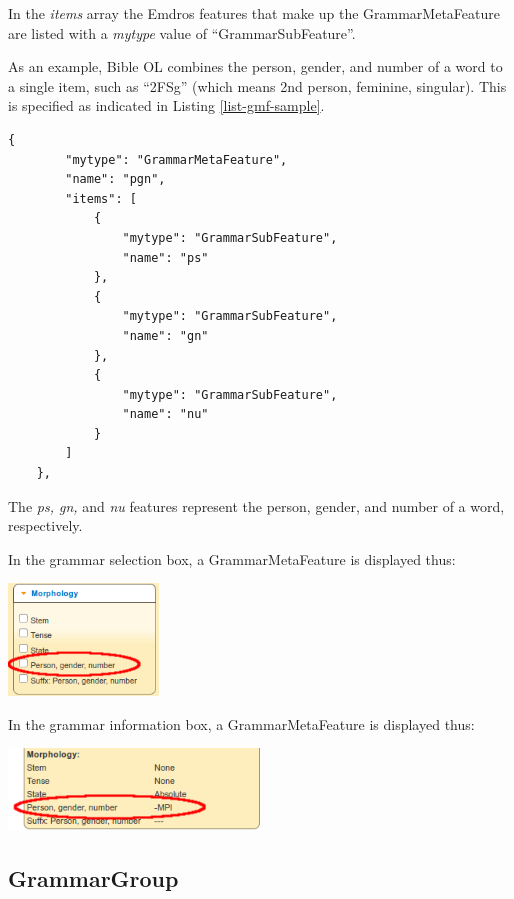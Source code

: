 \documentclass[11pt,oneside,a4paper]{memoir}
\begin{document}
In the \emph{items} array the Emdros features that make up the GrammarMetaFeature are listed with a
\emph{mytype} value of ``GrammarSubFeature''.

As an example, Bible OL combines the person, gender, and number of a word to a single item, such as
``2FSg'' (which means 2nd person, feminine, singular). This is specified as indicated in Listing
\ref{list-gmf-sample}.

\begin{lstlisting}[caption={A GrammarMetaFeature combining person, gender, and number},label=list-gmf-sample]
    {
        "mytype": "GrammarMetaFeature",
        "name": "pgn",
        "items": [
            {
                "mytype": "GrammarSubFeature",
                "name": "ps"
            },
            {
                "mytype": "GrammarSubFeature",
                "name": "gn"
            },
            {
                "mytype": "GrammarSubFeature",
                "name": "nu"
            }
        ]
    },
\end{lstlisting}

The \emph{ps, gn,} and \emph{nu} features represent the person, gender, and number of a word,
respectively.


\Needspace*{5cm}%
In the grammar selection box, a GrammarMetaFeature is displayed thus:

\begin{center}
  \includegraphics[width=0.3\textwidth]{pgn1.png}
\end{center}

\Needspace*{5cm}%
In the grammar information box, a GrammarMetaFeature is displayed thus:

\begin{center}
  \includegraphics[width=0.5\textwidth]{pgn2.png}
\end{center}


\subsection{GrammarGroup}\label{sec-grammargroup}
\end{document}
